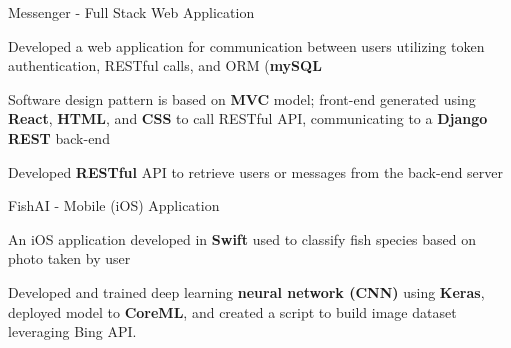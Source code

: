 \begin{siderulesProj}
\par\addvspace{-1.2ex}
\begin{cventriesproject}
  \cventryproject
    {Messenger - Full Stack Web Application}
    {
      \begin{cvskillitems}
        \item { Developed a web application for communication between users utilizing token authentication, RESTful calls, and ORM (\textbf{mySQL}}
        \item {Software design pattern is based on \textbf{MVC} model; front-end generated using \textbf{React}, \textbf{HTML}, and \textbf{CSS} to call RESTful API, communicating to a \textbf{Django REST} back-end}
        \item {Developed \textbf{RESTful} API to retrieve users or messages from the back-end server}
      \end{cvskillitems}
    }
  \cventryproject
    {FishAI - Mobile (iOS) Application}
    {
      \begin{cvskillitems}
        \item {An iOS application developed in \textbf{Swift} used to classify fish species based on photo taken by user}
        \item {Developed and trained deep learning \textbf{neural network (CNN)} using \textbf{Keras}, deployed model to \textbf{CoreML}, and created a script to build image dataset leveraging Bing API.}
      \end{cvskillitems}
    }
\end{cventriesproject}
\end{siderulesProj}
